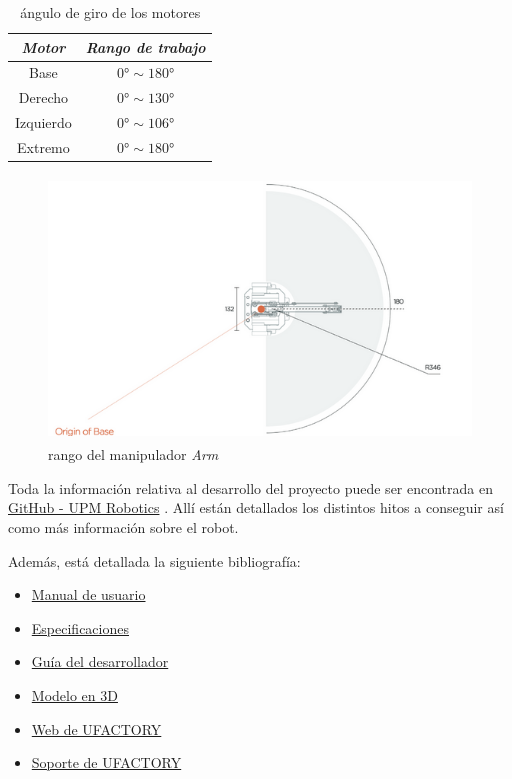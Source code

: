 \documentclass[a4paper,12pt]{article}
\begin{document}
\begin{table}[ht]
    \centering
    \begin{tabular}{||c | c||}
        \hline
        \textit{Motor} & \textit{Rango de trabajo} \\ [0.5ex]
        \hline\hline
        Base & $\ang{0} \sim \ang{180}$ \\
        \hline
        Derecho & $\ang{0} \sim \ang{130}$ \\
        \hline
        Izquierdo & $\ang{0} \sim \ang{106}$ \\
        \hline
        Extremo & $\ang{0} \sim \ang{180}$ \\ [1ex]
        \hline
    \end{tabular}
    \caption{ángulo de giro de los motores}
\end{table}

\begin{figure}[H]
    \centering
    \includegraphics[height=7cm]{images/range.png}
    \caption{rango del manipulador \emph{{\textmu}Arm} \cite{user_manual_uarm}}
    \label{fig:range}
\end{figure}

Toda la información relativa al desarrollo del proyecto puede ser encontrada en
\href{https://github.com/UPM-Robotics/uarm}{GitHub - UPM Robotics} \cite{noauthor_upm-robotics/uarm_2019}. Allí están detallados
los distintos hitos a conseguir así como más información sobre el robot.

Además, está detallada la siguiente bibliografía:
\begin{itemize}
    \item \href{https://github.com/UPM-Robotics/uarm/blob/master/docs/robot-information/uArm%20pro%20User%20Manual%20v1.1.0.pdf}{Manual de usuario}
    \item \href{https://github.com/UPM-Robotics/uarm/blob/master/docs/robot-information/uArm-Swift-Specifications-171012.pdf}{Especificaciones}
    \item \href{https://github.com/UPM-Robotics/uarm/blob/master/docs/robot-information/uArm%20Swift%20Pro_Developer%20Guide%20v1.0.6.pdf}{Guía del desarrollador}
    \item \href{https://github.com/UPM-Robotics/uarm/blob/master/docs/robot-information/uArm_Swift_Pro_3D_20180620.STEP}{Modelo en 3D}
    \item \href{https://www.ufactory.cc/#/en/}{Web de UFACTORY}
    \item \href{https://www.ufactory.cc/#/en/support/technology}{Soporte de UFACTORY}
\end{itemize}
\end{document}
